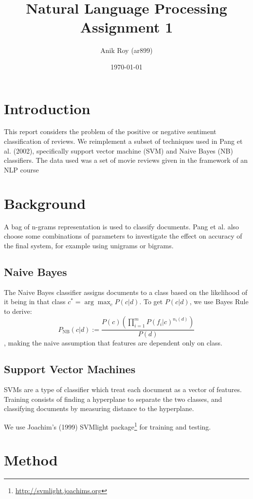 \documentclass[12pt,a4paper]{article}
\title{
  Natural Language Processing \\
  \large Assignment 1}
\author{Anik Roy (ar899)}
\date{\today}
\begin{document}
\maketitle
\begin{multicols}{2}
  
\section{Introduction}

This report considers the problem of the positive or negative sentiment classification of reviews. We reimplement a subset of techniques used in Pang et al. (2002)\cite{pang2002thumbs}, specifically support vector machine (SVM) and Naive Bayes (NB) classifiers. The data used was a set of movie reviews given in the framework of an NLP course

\section{Background}

A bag of n-grams representation is used to classify documents. Pang et al. also choose some combinations of parameters to investigate the effect on accuracy of the final system, for example using unigrams or bigrams.

\subsection{Naive Bayes}
The Naive Bayes classifier assigns documents to a class based on the likelihood of it being in that class $c^{*} = \arg \max_{c}P(c | d)$. To get $P(c | d)$, we use Bayes Rule to derive:
\[P_\mathrm{NB}(c | d) := \frac{P(c)(\prod^{m}_{i=1}P(f_{i} | c)^{n_{i}(d)})}{P(d)} \], 
making the naive assumption that features are dependent only on class.

\subsection{Support Vector Machines}
SVMs are a type of classifier which treat each document as a vector of features. Training consists of finding a hyperplane to separate the two classes, and classifying documents by measuring distance to the hyperplane.

We use Joachim's (1999) SVMlight package\footnote{\url{http://svmlight.joachims.org}} for training and testing.

\section{Method}


\end{multicols}
\end{document}
